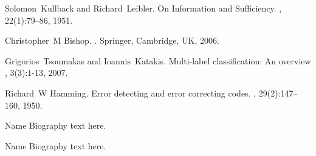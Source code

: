 \documentclass[9pt,journal,compsoc]{IEEEtran}
\begin{document}
\begin{thebibliography}{10}
Solomon~Kullback and Richard~Leibler.
\newblock On Information and Sufficiency.
, 22(1):79–86, 1951.

Christopher~M Bishop.
.
\newblock Springer, Cambridge, UK, 2006.

Grigorios~Tsoumakas and Ioannis~Katakis.
\newblock Multi-label classification: An overview
, 3(3):1-13, 2007.

Richard~W Hamming.
\newblock Error detecting and error correcting codes.
, 29(2):147–160, 1950.


\end{thebibliography}

% 

\begin{IEEEbiography}{Name}
Biography text here.
\end{IEEEbiography}

\begin{IEEEbiographynophoto}{Name}
Biography text here.
\end{IEEEbiographynophoto}







\end{document}
